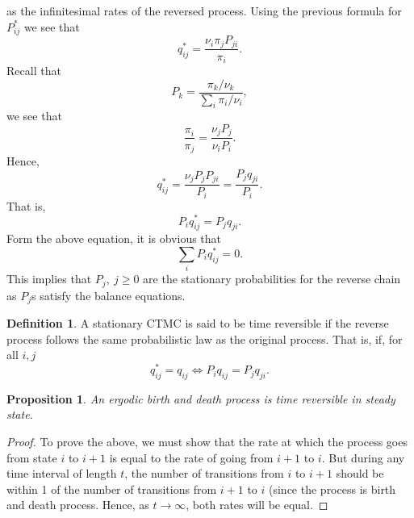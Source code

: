 \documentclass[a4paper,10pt]{article}
\theoremstyle{plain}
\newtheorem{prop}[thm]{Proposition}
\theoremstyle{definition}
\newtheorem{defn}[thm]{Definition}
\theoremstyle{remark}
\begin{document}
as the infinitesimal rates of the reversed process. Using the previous formula for $P_{ij}^*$ we see that
\begin{equation}
q_{ij}^*=\frac{\nu_i\pi_jP_{ji}}{\pi_i}.
\end{equation} 
Recall that 
\begin{equation}
P_{k}=\frac{\pi_k / \nu_k}{\sum_{i}\pi_i / \nu_i},
\end{equation}
we see that 
\begin{equation}
\frac{\pi_i}{\pi_j}=\frac{\nu_j P_j}{\nu_i P_i}.
\end{equation}
Hence, 
\begin{equation}
q_{ij}^*=\frac{\nu_j P_{j}P_{ji}}{P_i}= \frac{P_jq_{ji}}{P_i}.
\end{equation}
That is,
\begin{equation*}
P_{i}q_{ij}^*=P_{j}q_{ji}.
\end{equation*}
Form the above equation, it is obvious that 
\begin{equation*}
\sum_{i}P_i q_{ij}^*=0.
\end{equation*} 
This implies that $P_j,~j \geq 0$ are the stationary probabilities for the reverse chain as $P_j$s satisfy the balance equations.
\begin{defn}
A stationary CTMC is said to be time reversible if the reverse process follows the same probabilistic law as the original process. That is, if, for all $i,j$
\begin{equation*}
q_{ij}^*= q_{ij} \iff P_{i}q_{ij}=P_jq_{ji}.
\end{equation*} 
\end{defn} 
\begin{prop}
An ergodic birth and death process is time reversible in steady state.
\end{prop}
\begin{proof}
To prove the above, we must show that the rate at which the process goes from state $i$ to $i+1$ is equal to the rate of going from $i+1$ to $i$. But during any time interval of length $t$, the number of transitions from $i$ to $i+1$ should be within 1 of the number of transitions from $i+1$ to $i$ (since the process is birth and death process. Hence, as $t \rightarrow \infty$,  both rates will be equal. 
\end{proof}
\end{document}

